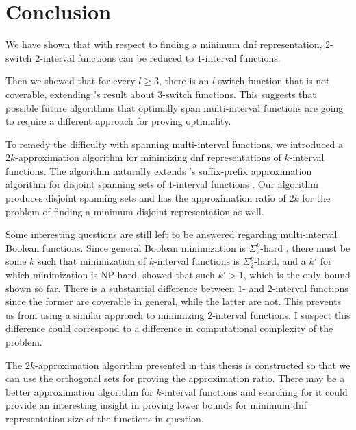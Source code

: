 \chapter*{Conclusion}

We have shown that
with respect to finding
a minimum \acrshort{dnf} representation,
$2$-switch $2$-interval functions
can be reduced to $1$-interval functions.

Then we showed that for every $l \geq 3$,
there is an $l$-switch function that is not coverable,
extending \citeauthor{Dubovsky2012}'s result
about $3$-switch functions.
This suggests that possible future algorithms
that optimally span multi-interval functions
are going to require a different approach
for proving optimality.

To remedy the difficulty with spanning multi-interval
functions,
we introduced a $2k$-approximation algorithm
for minimizing \acrshort{dnf} representations
of $k$-interval functions.
The algorithm naturally extends
\citeauthor{Schieber2005154}'s suffix-prefix
approximation algorithm
for disjoint spanning sets of $1$-interval functions
\citep[section 6]{Schieber2005154}.
Our algorithm produces disjoint spanning sets
and has the approximation ratio of $2k$
for the problem of finding
a minimum disjoint representation as well.

Some interesting questions are still left to be answered
regarding multi-interval Boolean functions.
Since general Boolean minimization is
$\Sigma_2^p$-hard \citep{Umans1998},
there must
be some $k$ such that minimization
of $k$-interval functions is $\Sigma_2^p$-hard,
and a $k'$ for which minimization is NP-hard.
\citeauthor{Schieber2005154} showed that such $k' > 1$,
which is the only bound shown so far.
There is a substantial difference
between $1$- and $2$-interval functions
since the former are coverable in general,
while the latter are not.
This prevents us from using a similar approach
to minimizing $2$-interval functions.
I suspect this difference could correspond to
a difference in computational complexity of the problem.

The $2k$-approximation algorithm presented in this thesis
is constructed so that we can use the orthogonal sets
for proving the approximation ratio.
There may be a better approximation algorithm
for $k$-interval functions
and searching for it could provide an interesting insight
in proving lower bounds for minimum \acrshort{dnf}
representation size of the functions in question.
